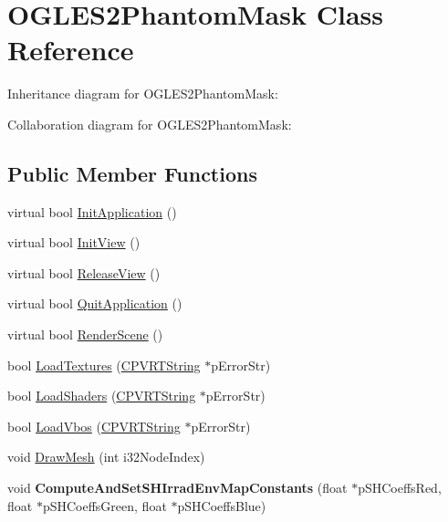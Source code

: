 \hypertarget{class_o_g_l_e_s2_phantom_mask}{\section{O\+G\+L\+E\+S2\+Phantom\+Mask Class Reference}
\label{class_o_g_l_e_s2_phantom_mask}
}


Inheritance diagram for O\+G\+L\+E\+S2\+Phantom\+Mask\+:


Collaboration diagram for O\+G\+L\+E\+S2\+Phantom\+Mask\+:
\subsection*{Public Member Functions}
\begin{DoxyCompactItemize}
\item 
virtual bool \hyperlink{class_o_g_l_e_s2_phantom_mask_a8cfa95d623bb8201bbb34da6badb1214}{Init\+Application} ()
\item 
virtual bool \hyperlink{class_o_g_l_e_s2_phantom_mask_a61ebd3e9c942b72ee032ec23a3814747}{Init\+View} ()
\item 
virtual bool \hyperlink{class_o_g_l_e_s2_phantom_mask_a98df6644888425395d08d5faae3bc872}{Release\+View} ()
\item 
virtual bool \hyperlink{class_o_g_l_e_s2_phantom_mask_a40bca6d8f3c2e8fc7d1b91999ba8f707}{Quit\+Application} ()
\item 
virtual bool \hyperlink{class_o_g_l_e_s2_phantom_mask_a9e3f672b649742ff984a5d163fd451b7}{Render\+Scene} ()
\item 
bool \hyperlink{class_o_g_l_e_s2_phantom_mask_a50ffac0a9b5802b67e8561057a6eb22a}{Load\+Textures} (\hyperlink{class_c_p_v_r_t_string}{C\+P\+V\+R\+T\+String} $\ast$p\+Error\+Str)
\item 
bool \hyperlink{class_o_g_l_e_s2_phantom_mask_a267ab9a7f4740f8adad092e7a7df5c14}{Load\+Shaders} (\hyperlink{class_c_p_v_r_t_string}{C\+P\+V\+R\+T\+String} $\ast$p\+Error\+Str)
\item 
bool \hyperlink{class_o_g_l_e_s2_phantom_mask_a8770065a0961aa7aee66367c04648ce6}{Load\+Vbos} (\hyperlink{class_c_p_v_r_t_string}{C\+P\+V\+R\+T\+String} $\ast$p\+Error\+Str)
\item 
void \hyperlink{class_o_g_l_e_s2_phantom_mask_a8822bfa0a5d019f0d885d75bb02bbe52}{Draw\+Mesh} (int i32\+Node\+Index)
\item 
\hypertarget{class_o_g_l_e_s2_phantom_mask_ab3f8d95606e8a8dab63554434d34fa0d}{void {\bfseries Compute\+And\+Set\+S\+H\+Irrad\+Env\+Map\+Constants} (float $\ast$p\+S\+H\+Coeffs\+Red, float $\ast$p\+S\+H\+Coeffs\+Green, float $\ast$p\+S\+H\+Coeffs\+Blue)}\label{class_o_g_l_e_s2_phantom_mask_ab3f8d95606e8a8dab63554434d34fa0d}

\end{DoxyCompactItemize}


